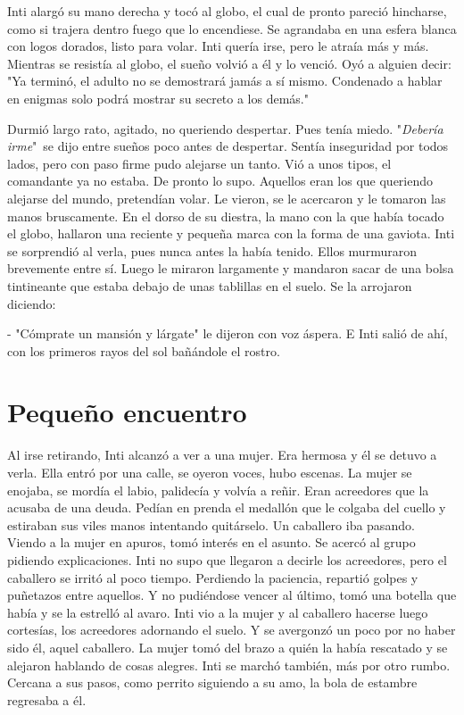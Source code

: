 Inti alargó su mano derecha y tocó al globo, el cual de pronto pareció hincharse, como si trajera dentro fuego que lo encendiese. Se agrandaba en una esfera blanca con logos dorados, listo para volar. Inti quería irse, pero le atraía más y más. Mientras se resistía al globo, el sueño volvió a él y lo venció. Oyó a alguien decir: "Ya terminó, el adulto no se demostrará jamás a sí mismo. Condenado a hablar en enigmas solo podrá mostrar su secreto a los demás."

Durmió largo rato, agitado, no queriendo despertar. Pues tenía miedo. "\emph{Debería irme}"\, se dijo entre sueños poco antes de despertar. Sentía inseguridad por todos lados, pero con paso firme pudo alejarse un tanto. Vió a unos tipos, el comandante ya no estaba. De pronto lo supo. Aquellos eran los que queriendo alejarse del mundo, pretendían volar. Le vieron, se le acercaron y le tomaron las manos bruscamente. En el dorso de su diestra, la mano con la que había tocado el globo, hallaron una reciente y pequeña marca con la forma de una gaviota. Inti se sorprendió al verla, pues nunca antes la había tenido. Ellos murmuraron brevemente entre sí. Luego le miraron largamente y mandaron sacar de una bolsa tintineante que estaba debajo de unas tablillas en el suelo. Se la arrojaron diciendo:

- "Cómprate un mansión y lárgate" le dijeron con voz áspera. E Inti salió de ahí, con los primeros rayos del sol bañándole el rostro.



\chapter{Pequeño encuentro}
Al irse retirando, Inti alcanzó a ver a una mujer. Era hermosa y él se detuvo a verla. Ella entró por una calle, se oyeron voces, hubo escenas. La mujer se enojaba, se mordía el labio, palidecía y volvía a reñir. Eran acreedores que la acusaba de una deuda. Pedían en prenda el medallón que le colgaba del cuello y estiraban sus viles manos intentando quitárselo. Un caballero iba pasando. Viendo a la mujer en apuros, tomó interés en el asunto. Se acercó al grupo pidiendo explicaciones. Inti no supo que llegaron a decirle 
los acreedores, pero el caballero se irritó al poco tiempo. Perdiendo la paciencia, repartió golpes y puñetazos entre aquellos. Y no pudiéndose vencer al último, tomó una botella que había y se la estrelló al avaro. Inti vio a la mujer y al caballero hacerse luego cortesías, los acreedores adornando el suelo. Y se avergonzó un poco por no haber sido él, aquel caballero. La mujer tomó del brazo a quién la había rescatado y se alejaron hablando de cosas alegres. Inti se marchó también, más por otro rumbo. Cercana a sus pasos, 
como perrito siguiendo a su amo, la bola de estambre regresaba a él.


